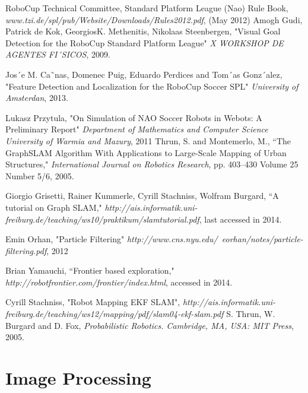 \documentclass{ba-kecs}
\numberwithin{figure}{section}
\numberwithin{equation}{section}
\begin{document}

\begin{thebibliography}{99}

 RoboCup Technical Committee, Standard Platform League (Nao) Rule Book, \emph{www.tzi.de/spl/pub/Website/Downloads/Rules2012.pdf}, (May 2012)
 Amogh Gudi, Patrick de Kok, GeorgiosK. Methenitis, Nikolaas Steenbergen, "Visual Goal Detection for the RoboCup Standard Platform League" \emph{X WORKSHOP DE AGENTES FI´SICOS}, 2009.

 Jos´e M. Ca˜nas, Domenec Puig, Eduardo Perdices and Tom´as Gonz´alez, "Feature Detection and Localization for the
RoboCup Soccer SPL" \emph{University of Amsterdan}, 2013.

 Lukasz Przytula, "On Simulation of NAO Soccer Robots in Webots: A Preliminary Report" \emph{Department of Mathematics and Computer Science University of Warmia and Mazury}, 2011
 Thrun, S. and Montemerlo, M., ``The GraphSLAM Algorithm With Applications to Large-Scale Mapping of Urban Structures," \emph{International Journal on Robotics Research}, pp. 403--430 Volume 25 Number 5/6, 2005.

 Giorgio Grisetti, Rainer Kummerle, Cyrill Stachniss, Wolfram Burgard, ``A tutorial on Graph SLAM," \emph{http://ais.informatik.uni-freiburg.de/teaching/ws10/praktikum/slamtutorial.pdf}, last accessed in 2014.

 Emin Orhan, "Particle Filtering" \emph{http://www.cns.nyu.edu/~eorhan/notes/particle-filtering.pdf}, 2012
 
 Brian Yamauchi, ``Frontier based exploration," \emph{http://robotfrontier.com/frontier/index.html}, accessed in 2014. 

 Cyrill Stachniss, "Robot Mapping EKF SLAM", \emph{http://ais.informatik.uni-freiburg.de/teaching/ws12/mapping/pdf/slam04-ekf-slam.pdf }
 S. Thrun, W. Burgard and D. Fox, \emph{Probabilistic Robotics. Cambridge, MA, USA: MIT Press}, 2005.


\end{thebibliography}

\appendix
\section{Image Processing}
\end{document}
